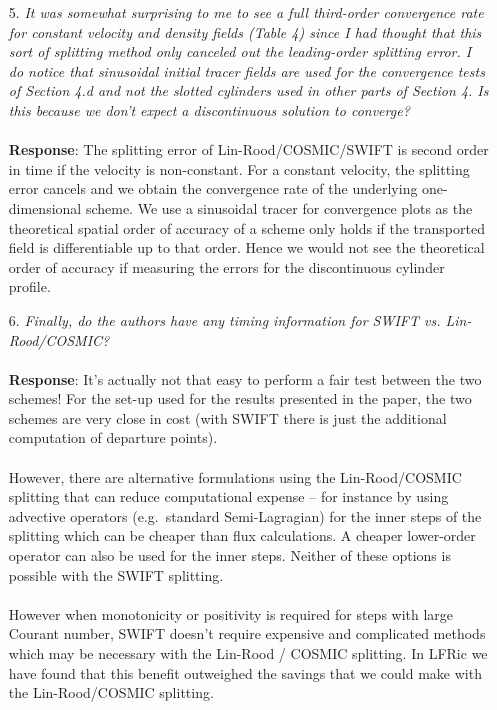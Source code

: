 \documentclass[11pt,a4paper]{article}
\begin{document}
\begin{enumerate}[leftmargin=*]
\item[5.] \textit{It was somewhat surprising to me to see a full third-order convergence rate for constant velocity and density fields (Table 4) since I had thought that this sort of splitting method only canceled out the leading-order splitting error. I do notice that sinusoidal initial tracer fields are used for the convergence tests of Section 4.d and not the slotted cylinders used in other parts of Section 4. Is this because we don’t expect a discontinuous solution to converge?} \\
\\
\textbf{Response}: The splitting error of Lin-Rood/COSMIC/SWIFT is second order in time if the velocity is non-constant. For a constant velocity, the splitting error cancels and we obtain the convergence rate of the underlying one-dimensional scheme. We use a sinusoidal tracer for convergence plots as the theoretical spatial order of accuracy of a scheme only holds if the transported field is differentiable up to that order. Hence we would not see the theoretical order of accuracy if measuring the errors for the discontinuous cylinder profile.

\item[6.] \textit{Finally, do the authors have any timing information for SWIFT vs. Lin-Rood/COSMIC?} \\
\\
\textbf{Response}: It's actually not that easy to perform a fair test between the two schemes! For the set-up used for the results presented in the paper, the two schemes are very close in cost (with SWIFT there is just the additional computation of departure points). \\
\\
However, there are alternative formulations using the Lin-Rood/COSMIC splitting that can reduce computational expense -- for instance by using advective operators (e.g.\ standard Semi-Lagragian) for the inner steps of the splitting which can be cheaper than flux calculations. A cheaper lower-order operator can also be used for the inner steps. Neither of these options is possible with the SWIFT splitting. \\
\\
However when monotonicity or positivity is required for steps with large Courant number, SWIFT doesn't require expensive and complicated methods which may be necessary with the Lin-Rood / COSMIC splitting. In LFRic we have found that this benefit outweighed the savings that we could make with the Lin-Rood/COSMIC splitting.
\end{enumerate}
\end{document}
